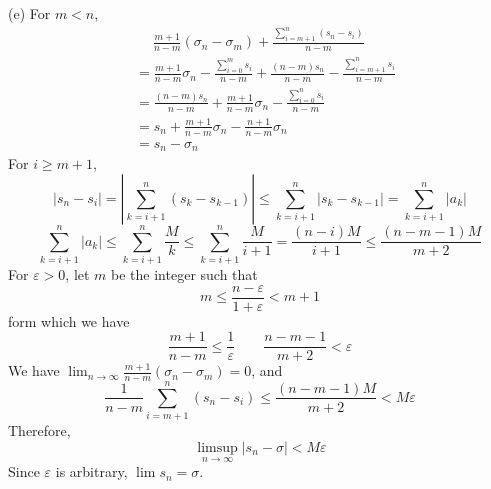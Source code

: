 \documentclass[a4paper]{article}
\begin{document}
(e)
For $m<n$,
\begin{equation*}
    \begin{split}
        & \quad\;\frac{m+1}{n-m}(\sigma_n-\sigma_m)+\frac{\sum_{i=m+1}^n(s_n-s_i)}{n-m}\\
        & =\frac{m+1}{n-m}\sigma_n-\frac{\sum_{i=0}^m s_i}{n-m}+\frac{(n-m)s_n}{n-m}-\frac{\sum_{i=m+1}^n s_i}{n-m}\\
        & =\frac{(n-m)s_n}{n-m}+\frac{m+1}{n-m}\sigma_n-\frac{\sum_{i=0}^n s_i}{n-m}\\
        & =s_n+\frac{m+1}{n-m}\sigma_n-\frac{n+1}{n-m}\sigma_n\\
        & =s_n-\sigma_n
    \end{split}
\end{equation*}
For $i\geq m+1$,
\[
|s_n-s_i|=\left|\sum_{k=i+1}^n(s_k-s_{k-1}) \right|\leq\sum_{k=i+1}^n|s_k-s_{k-1}|=\sum_{k=i+1}^n|a_k|\]
\[
\sum_{k=i+1}^n|a_k|\leq\sum_{k=i+1}^n\frac{M}{k}\leq\sum_{k=i+1}^n\frac{M}{i+1}=\frac{(n-i)M}{i+1}\leq\frac{(n-m-1)M}{m+2}
\]
For $\varepsilon>0$, let $m$ be the integer such that 
\[
m\leq\frac{n-\varepsilon}{1+\varepsilon}<m+1
\]
form which we have
\[
\frac{m+1}{n-m}\leq\frac{1}{\varepsilon}\qquad\frac{n-m-1}{m+2}<\varepsilon
\]
We have $\lim_{n\to\infty}\frac{m+1}{n-m}(\sigma_n-\sigma_m)=0$, and
\[
\frac{1}{n-m}\sum_{i=m+1}^n(s_n-s_i)\leq\frac{(n-m-1)M}{m+2}<M\varepsilon
\]
Therefore,
\[
\limsup_{n\to\infty}|s_n-\sigma|<M\varepsilon
\]
Since $\varepsilon$ is arbitrary, $\lim s_n=\sigma$.
\end{document}
